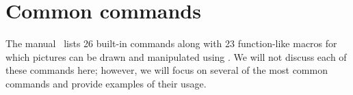 \section{Common commands}
\label{sec:commoncmds}

The \MP{} manual~\cite{hobby:user} lists 26 built-in commands along with
23 function-like macros for which pictures can be drawn and manipulated
using \MP.  We will not discuss each of these commands here; however, we
will focus on several of the most common commands and provide examples
of their usage.





